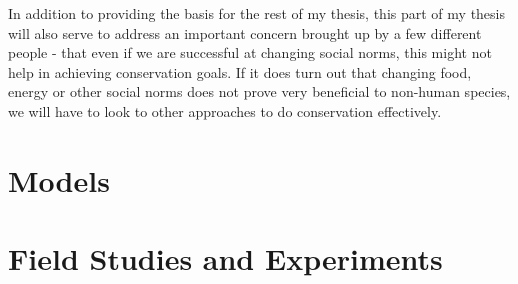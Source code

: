 \documentclass[rutwik_proposal.tex]{subfiles}
\begin{document}
In addition to providing the basis for the rest of my thesis, this part of my thesis will also serve to address an important concern brought up by a few different people - that even if we are successful at changing social norms, this might not help in achieving conservation goals. If it does turn out that changing food, energy or other social norms does not prove very beneficial to non-human species, we will have to look to other approaches to do conservation effectively.

\chapter{Models}\label{ch:models}

\chapter{Field Studies and Experiments}\label{ch:field}
\end{document}

